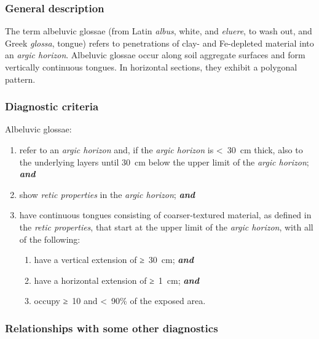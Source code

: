 \documentclass[
  letterpaper,
  DIV=11,
  numbers=noendperiod]{scrreprt}
\providecommand{\tightlist}{%
  \setlength{\itemsep}{0pt}\setlength{\parskip}{0pt}}\usepackage{longtable,booktabs,array}
\begin{document}
\hypertarget{general-description-41}{%
\subsubsection{General description}\label{general-description-41}}

The term albeluvic glossae (from Latin \emph{albus}, white, and
\emph{eluere}, to wash out, and Greek \emph{glossa}, tongue) refers to
penetrations of clay- and Fe-depleted material into an \emph{argic
horizon}. Albeluvic glossae occur along soil aggregate surfaces and form
vertically continuous tongues. In horizontal sections, they exhibit a
polygonal pattern.

\hypertarget{diagnostic-criteria-41}{%
\subsubsection{Diagnostic criteria}\label{diagnostic-criteria-41}}

Albeluvic glossae:

\begin{enumerate}
\def\labelenumi{\arabic{enumi}.}
\item
  refer to an \emph{argic horizon} and, if the \emph{argic horizon} is
  \textless~30~cm thick, also to the underlying layers until 30~cm below
  the upper limit of the \emph{argic horizon}; \textbf{\emph{and}}
\item
  show \emph{retic properties} in the \emph{argic horizon};
  \textbf{\emph{and}}
\item
  have continuous tongues consisting of coarser-textured material, as
  defined in the \emph{retic properties}, that start at the upper limit
  of the \emph{argic horizon}, with all of the following:

  \begin{enumerate}
  \def\labelenumii{\alph{enumii})}
  \tightlist
  \item
    have a vertical extension of ≥~30~cm; \textbf{\emph{and}}
  \item
    have a horizontal extension of ≥~1~cm; \textbf{\emph{and}}
  \item
    occupy ≥~10 and \textless~90\% of the exposed area.
  \end{enumerate}
\end{enumerate}

\hypertarget{relationships-with-some-other-diagnostics-39}{%
\subsubsection{Relationships with some other
diagnostics}\label{relationships-with-some-other-diagnostics-39}}
\end{document}
